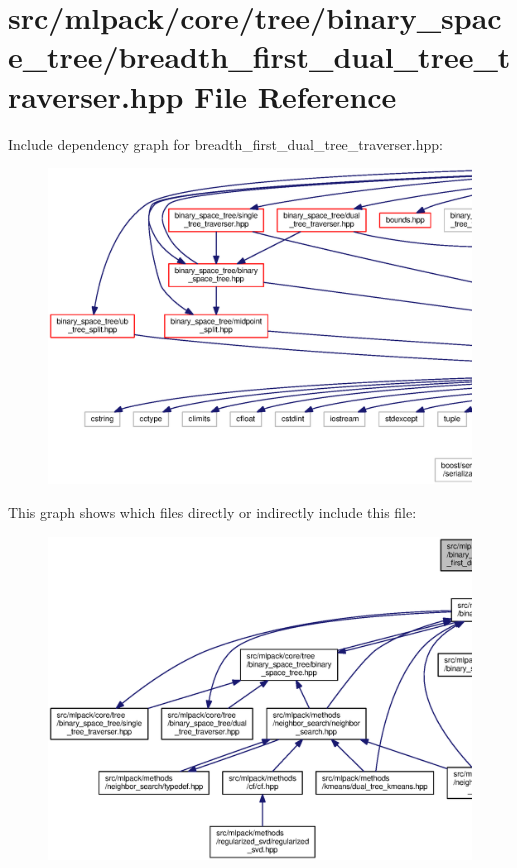 \section{src/mlpack/core/tree/binary\+\_\+space\+\_\+tree/breadth\+\_\+first\+\_\+dual\+\_\+tree\+\_\+traverser.hpp File Reference}
\label{breadth__first__dual__tree__traverser_8hpp}
Include dependency graph for breadth\+\_\+first\+\_\+dual\+\_\+tree\+\_\+traverser.\+hpp\+:
\nopagebreak
\begin{figure}[H]
\begin{center}
\leavevmode
\includegraphics[width=350pt]{breadth__first__dual__tree__traverser_8hpp__incl}
\end{center}
\end{figure}
This graph shows which files directly or indirectly include this file\+:
\nopagebreak
\begin{figure}[H]
\begin{center}
\leavevmode
\includegraphics[width=350pt]{breadth__first__dual__tree__traverser_8hpp__dep__incl}
\end{center}
\end{figure}
